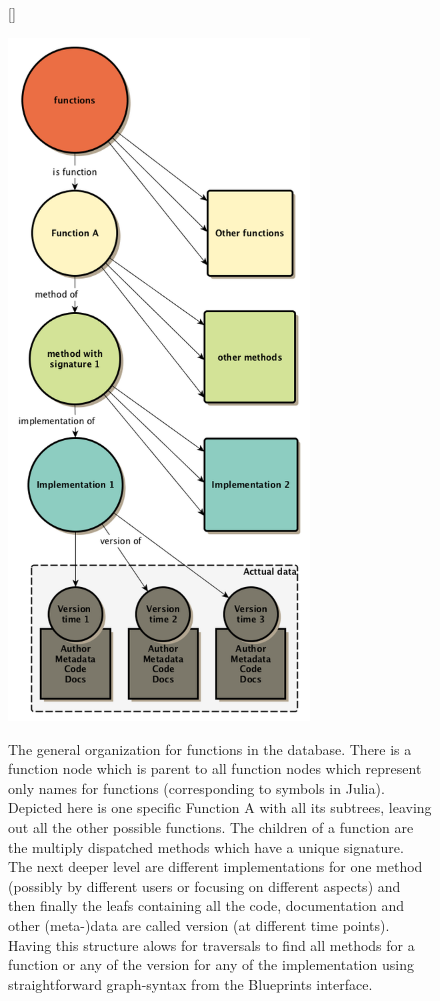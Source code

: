 \documentclass[11p]{scrartcl}
\begin{document}
\begin{figure}[h!]		
	[\FBwidth]
	{\caption{The general organization for functions in the database. There is a function node which is parent to all function nodes which represent only names for functions (corresponding to symbols in Julia). Depicted here is one specific Function A with all its subtrees, leaving out all the other possible functions. The children of a function are the multiply dispatched methods which have a unique signature. The next deeper level are different implementations for one method (possibly by different users or focusing on different aspects) and then finally the leafs containing all the code, documentation and other (meta-)data are called version (at different time points). Having this structure alows for traversals to find all methods for a function or any of the version for any of the implementation using straightforward graph-syntax from the Blueprints interface.}\label{fig:dbStructure1}}
	{\includegraphics[width=8cm]{figures/dbStructure1}}
\end{figure}
\end{document}
